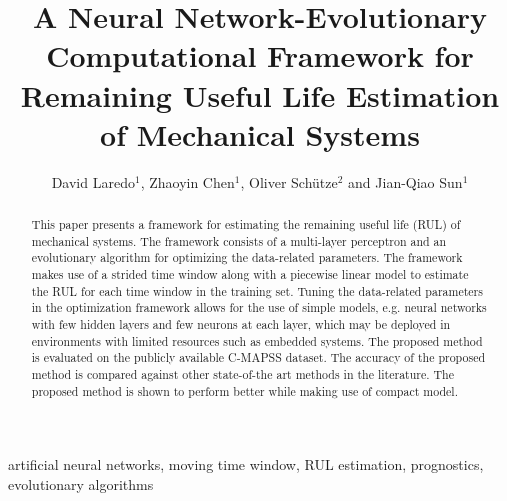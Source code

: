 


\begin{frontmatter}

\title{A Neural Network-Evolutionary Computational Framework for Remaining Useful Life Estimation of Mechanical Systems}

\author{David Laredo$^{1}$, Zhaoyin Chen$^{1}$, Oliver Sch\"utze$^{2}$ and Jian-Qiao Sun$^{1}$}
\address{
$^{1}$Department of Mechanical Engineering\\
School of Engineering, University of California\\
Merced, CA 95343, USA\\
$^{2}$Department of Computer Science, CINVESTAV\\ 
Mexico City, Mexico\\
Corresponding author. Email: jqsun@ucmerced.edu}

\begin{abstract}
This paper presents a framework for estimating the remaining useful life (RUL) of mechanical systems. The framework consists of a multi-layer perceptron and an evolutionary algorithm for optimizing the data-related parameters. The framework makes use of a strided time window along with a piecewise linear model to estimate the RUL for each time window in the training set. Tuning the data-related parameters in the optimization framework allows for the use of simple models, e.g. neural networks with few hidden layers and few neurons at each layer, which may be deployed in environments with limited resources such as embedded systems. The proposed method is evaluated on the publicly available C-MAPSS dataset. The accuracy of the proposed method is compared against other state-of-the art methods in the literature. The proposed method is shown to perform better while making use of compact model.

\end{abstract}


\begin{keyword}
artificial neural networks\sep
moving time window\sep
RUL estimation\sep
prognostics\sep
evolutionary algorithms
\end{keyword}

\end{frontmatter}

